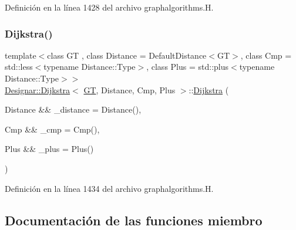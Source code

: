 Definición en la línea 1428 del archivo graphalgorithms.\+H.

\mbox{\label{class_designar_1_1_dijkstra_a26f374b129c8108d6b95fc57f8dc09df}} 
\subsubsection{\texorpdfstring{Dijkstra()}{Dijkstra()}\hspace{0.1cm}{\footnotesize\ttfamily [2/2]}}
{\footnotesize\ttfamily template$<$class GT , class Distance  = Default\+Distance$<$\+G\+T$>$, class Cmp  = std\+::less$<$typename Distance\+::\+Type$>$, class Plus  = std\+::plus$<$typename Distance\+::\+Type$>$$>$ \\
\hyperlink{class_designar_1_1_dijkstra}{Designar\+::\+Dijkstra}$<$ \hyperlink{demo-buildgraph_8_c_a3001c40d2c31ca87ed96cd7d1334a55e}{GT}, Distance, Cmp, Plus $>$\+::\hyperlink{class_designar_1_1_dijkstra}{Dijkstra} (\begin{DoxyParamCaption}\item[{Distance \&\&}]{\+\_\+distance = {\ttfamily Distance()},  }\item[{Cmp \&\&}]{\+\_\+cmp = {\ttfamily Cmp()},  }\item[{Plus \&\&}]{\+\_\+plus = {\ttfamily Plus()} }\end{DoxyParamCaption})\hspace{0.3cm}{\ttfamily [inline]}}



Definición en la línea 1434 del archivo graphalgorithms.\+H.



\subsection{Documentación de las funciones miembro}
\mbox{\label{class_designar_1_1_dijkstra_a70bbeb5dcd70c6ff3d203b7772021467}} 
